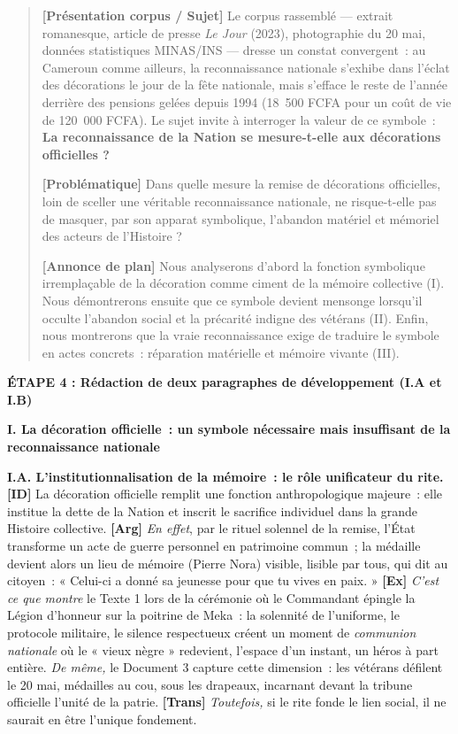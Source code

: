 \documentclass[11pt]{article}
\newcommand{\cle}[1]{{\popxbold\color{popdark}#1}}
\begin{document}
\begin{exoresolu}
\begin{quote}
\textbf{[Présentation corpus / Sujet]} Le corpus rassemblé — extrait romanesque, article de presse \emph{Le Jour} (2023), photographie du 20 mai, données statistiques MINAS/INS — dresse un constat convergent~: au Cameroun comme ailleurs, la reconnaissance nationale s'exhibe dans l'éclat des décorations le jour de la fête nationale, mais s'efface le reste de l'année derrière des pensions gelées depuis 1994 (18~500 FCFA pour un coût de vie de 120~000 FCFA). Le sujet invite à interroger la valeur de ce symbole~: \textbf{La reconnaissance de la Nation se mesure-t-elle aux décorations officielles ?}

\textbf{[Problématique]} Dans quelle mesure la remise de décorations officielles, loin de sceller une véritable reconnaissance nationale, ne risque-t-elle pas de masquer, par son apparat symbolique, l'abandon matériel et mémoriel des acteurs de l'Histoire ?

\textbf{[Annonce de plan]} Nous analyserons d'abord la fonction symbolique irremplaçable de la décoration comme ciment de la mémoire collective (I). Nous démontrerons ensuite que ce symbole devient mensonge lorsqu'il occulte l'abandon social et la précarité indigne des vétérans (II). Enfin, nous montrerons que la vraie reconnaissance exige de traduire le symbole en actes concrets~: réparation matérielle et mémoire vivante (III).
\end{quote}

\textbf{ÉTAPE 4 : Rédaction de deux paragraphes de développement (I.A et I.B)}

\noindent \textbf{I. La décoration officielle~: un symbole nécessaire mais insuffisant de la reconnaissance nationale}

\noindent \textbf{I.A. L'institutionnalisation de la mémoire~: le rôle unificateur du rite.}
\noindent \textbf{[ID]} La décoration officielle remplit une fonction anthropologique majeure~: elle institue la dette de la Nation et inscrit le sacrifice individuel dans la grande Histoire collective. \textbf{[Arg]} \emph{En effet}, par le rituel solennel de la remise, l'État transforme un acte de guerre personnel en patrimoine commun~; la médaille devient alors un \cle{lieu de mémoire} (Pierre Nora) visible, lisible par tous, qui dit au citoyen~: « Celui-ci a donné sa jeunesse pour que tu vives en paix. » \textbf{[Ex]} \emph{C'est ce que montre} le Texte 1 lors de la cérémonie où le Commandant épingle la Légion d'honneur sur la poitrine de Meka~: la solennité de l'uniforme, le protocole militaire, le silence respectueux créent un moment de \emph{communion nationale} où le « vieux nègre » redevient, l'espace d'un instant, un héros à part entière. \emph{De même,} le Document 3 capture cette dimension~: les vétérans défilent le 20 mai, médailles au cou, sous les drapeaux, incarnant devant la tribune officielle l'unité de la patrie. \textbf{[Trans]} \emph{Toutefois,} si le rite fonde le lien social, il ne saurait en être l'unique fondement.


\end{exoresolu}
\end{document}
